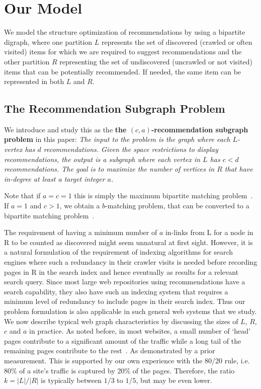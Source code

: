 \section{Our Model}

We model the structure optimization of recommendations by using a bipartite
digraph, where one partition $L$ represents the set of discovered (crawled or often visited) items for which
we are required to suggest recommendations and the other partition $R$
representing the set of undiscovered (uncrawled or not visited) items that can be potentially recommended. If
needed, the same item can be represented in both $L$ and $R$.
\vs

\subsection{The Recommendation Subgraph Problem}
We introduce and study this as the {\bf the $(c, a)$-recommendation subgraph problem} in this paper:
{\em
 The input to the problem is the graph where each
$L$-vertex has $d$ recommendations. Given the space restrictions to
display recommendations, the output is a subgraph where each vertex in
$L$ has $c < d$ recommendations. The goal is to maximize the number of
vertices in $R$ that have in-degree at least a target integer $a$.
}

\vs

Note that if $a=c=1$ this is simply the maximum bipartite
matching problem~\cite{LovaszPlummer1986}. If $a=1$ and $c > 1$, we
obtain a $b$-matching problem, that can be converted to a bipartite
matching problem~\cite{Gabow1983}.\vs

The requirement of having a minimum number of $a$ in-links from L for a node in R to be counted as discovered might seem unnatural at first sight. However, it is a natural formulation of the requirement of indexing algorithms for search engines where such a redundancy in their crawler visits is needed before recording pages in R in the search index and hence eventually as results for a relevant search query. Since most large web repositories using recommendations have a search capability, they also have such an indexing system that requires a minimum level of redundancy to include pages in their search index. Thus our problem formulation is also applicable in such general web systems that we study. \\

We now describe typical web graph characteristics by discussing the
sizes of $L$, $R$, $c$ and $a$ in practice. As noted before, in most
websites, a small number of `head' pages contribute to a significant
amount of the traffic while a long tail of the remaining pages
contribute to the rest~\cite{HubermanAdamic1999,
  DuDemmerBrewer2006, KumarNorrisSun2009}. As demonstrated by a prior
measurement. This is supported by our
own experience with the 80/20 rule, i.e. 80\% of a site's traffic is
captured by 20\% of the pages. Therefore, the ratio $k=|L|/|R|$ is
typically between $1/3$ to $1/5$, but may be even lower. \vs

